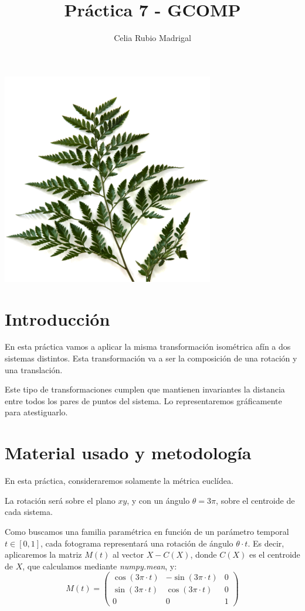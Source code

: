 \documentclass[a4paper]{article}
\author{Celia Rubio Madrigal}
\title{Práctica 7 - GCOMP}
\begin{document}
	\maketitle
	
	\tableofcontents
	
	\vfill
	
	\begin{center}
		\includegraphics[width=0.45\linewidth]{arbol}
	\end{center}
	
	
	\vfill
	\newpage
	
	\section{Introducción}
	En esta práctica vamos a aplicar la misma transformación isométrica afín a dos sistemas distintos. Esta transformación va a ser la composición de una rotación y una translación.
	
	Este tipo de transformaciones cumplen que mantienen invariantes la distancia entre todos los pares de puntos del sistema. Lo representaremos gráficamente para atestiguarlo.
	
	
	\section{Material usado y metodología}
	En esta práctica, consideraremos solamente la métrica euclídea. 
	
	La rotación será sobre el plano $xy$, y con un ángulo $\theta=3\pi$, sobre el centroide de cada sistema. 
	
	Como buscamos una familia paramétrica en función de un parámetro temporal $t\in[0,1]$, cada fotograma representará una rotación de ángulo $\theta\cdot t$. Es decir, aplicaremos la matriz $M(t)$ al vector $X-C(X)$, donde $C(X)$ es el centroide de $X$, que calculamos mediante \textit{numpy.mean}, y:
	\[ M(t) = \left(\begin{array}{ccc}
	\cos(3\pi\cdot t) & -\sin(3\pi\cdot t) & 0 \\
	\sin(3\pi\cdot t) & \cos(3\pi\cdot t) & 0\\
	0&0&1
	\end{array}\right)\]
	
\end{document}
